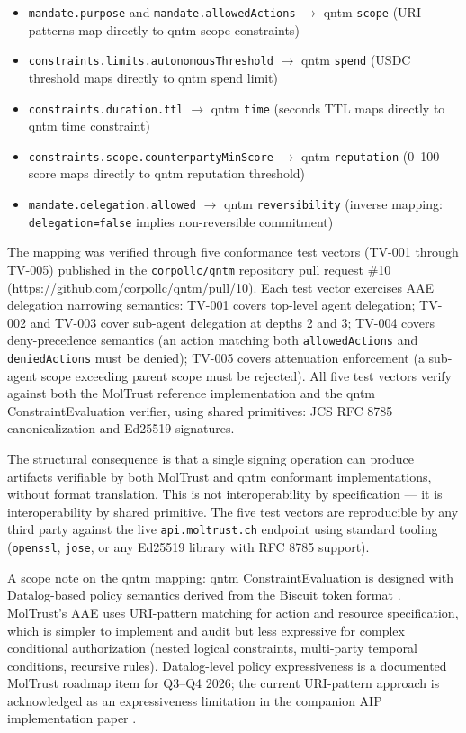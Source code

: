 \begin{itemize}
\item \texttt{mandate.purpose} and \texttt{mandate.allowedActions} $\rightarrow$ qntm \texttt{scope} (URI patterns map directly to qntm scope constraints)
\item \texttt{constraints.\allowbreak limits.\allowbreak autonomousThreshold} $\rightarrow$ qntm \texttt{spend} (USDC threshold maps directly to qntm spend limit)
\item \texttt{constraints.\allowbreak duration.\allowbreak ttl} $\rightarrow$ qntm \texttt{time} (seconds TTL maps directly to qntm time constraint)
\item \texttt{constraints.\allowbreak scope.\allowbreak counterpartyMinScore} $\rightarrow$ qntm \texttt{reputation} (0–100 score maps directly to qntm reputation threshold)
\item \texttt{mandate.\allowbreak delegation.\allowbreak allowed} $\rightarrow$ qntm \texttt{reversibility} (inverse mapping: \texttt{delegation=false} implies non-reversible commitment)
\end{itemize}

The mapping was verified through five conformance test vectors (TV-001 through TV-005) published in the \texttt{corpollc/qntm} repository pull request \#10 (https://github.com/corpollc/qntm/pull/10). Each test vector exercises AAE delegation narrowing semantics: TV-001 covers top-level agent delegation; TV-002 and TV-003 cover sub-agent delegation at depths 2 and 3; TV-004 covers deny-precedence semantics (an action matching both \texttt{allowedActions} and \texttt{deniedActions} must be denied); TV-005 covers attenuation enforcement (a sub-agent scope exceeding parent scope must be rejected). All five test vectors verify against both the MolTrust reference implementation and the qntm ConstraintEvaluation verifier, using shared primitives: JCS RFC 8785 canonicalization and Ed25519 signatures.


The structural consequence is that a single signing operation can produce artifacts verifiable by both MolTrust and qntm conformant implementations, without format translation. This is not interoperability by specification — it is interoperability by shared primitive. The five test vectors are reproducible by any third party against the live \texttt{api.moltrust.ch} endpoint using standard tooling (\texttt{openssl}, \texttt{jose}, or any Ed25519 library with RFC 8785 support).


A scope note on the qntm mapping: qntm ConstraintEvaluation is designed with Datalog-based policy semantics derived from the Biscuit token format \cite{ref34_biscuit}. MolTrust's AAE uses URI-pattern matching for action and resource specification, which is simpler to implement and audit but less expressive for complex conditional authorization (nested logical constraints, multi-party temporal conditions, recursive rules). Datalog-level policy expressiveness is a documented MolTrust roadmap item for Q3–Q4 2026; the current URI-pattern approach is acknowledged as an expressiveness limitation in the companion AIP implementation paper \cite{ref27_kroehlssrn}.


